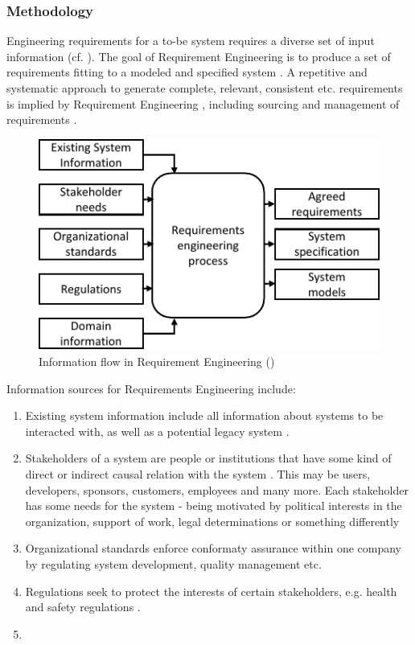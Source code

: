 \subsubsection{Methodology \label{sec:methReq}}
Engineering requirements for a to-be system requires a diverse set of input information (cf. ). The goal of Requirement Engineering is to produce a set of requirements fitting to a modeled and specified system \parencite[cf.][28]{Kotonya.2000}. A repetitive and systematic approach to generate complete, relevant, consistent etc. requirements is implied by Requirement Engineering \parencite[5]{Sommerville.2000}, including sourcing and management of requirements \parencite[262]{Pohl.2007}.
\begin{figure}[H]
    \centering
    \includegraphics[scale=1.3]{img/RequirementInformationStream.pdf}
    \caption[Information flow in Requirements Engineering]{Information flow in Requirement Engineering (\protect\cite[28]{Kotonya.2000})}
    \label{fig:reqFlow}
\end{figure}
Information sources for Requirements Engineering include:
\begin{enumerate}
    \item Existing system information include all information about systems to be interacted with, as well as a potential legacy system \parencite[cf.][28]{Kotonya.2000}.
    \item Stakeholders of a system are people or institutions that have some kind of direct or indirect causal relation with the system \parencite[cf.][8]{Sommerville.2000}. This may be users, developers, sponsors, customers, employees and many more. Each stakeholder has some needs for the system - being motivated by political interests in the organization, support of work, legal determinations or something differently \parencites[cf.][28]{Kotonya.2000}[cf.][350-351]{Lauesen.2008}
    \item Organizational standards enforce conformaty assurance within one company by regulating system development, quality management etc. \parencite[28]{Kotonya.2000}
    \item Regulations seek to protect the interests of certain stakeholders, e.g. health and safety regulations \parencite[cf.][28]{Kotonya.2000}.
    \item {} \parencite[28]{Kotonya.2000} 
\end{enumerate}

